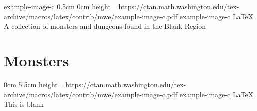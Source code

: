 \documentclass[letterpaper,openany,twoside,twocolumn]{book}
\begin{document}
		{example-image-c}%
		{0.5cm}%
		{0cm}%
		{height=\paperheight}%
		{https://ctan.math.washington.edu/tex-archive/macros/latex/contrib/mwe/example-image-c.pdf}%
		{example-image-c}%
		{LaTeX}%
		{A collection of monsters and dungeons found in the Blank Region}%
	
	\tableofcontents
	
	\mainmatter
	
	\MonsterSheetGeometry
	\part{Monsters}
	
	
		{0cm}%
		{5.5cm}%
		{height=\paperheight}%
		{https://ctan.math.washington.edu/tex-archive/macros/latex/contrib/mwe/example-image-c.pdf}%
		{example-image-c}%
		{LaTeX}%
		{This is blank}%
\end{document}
